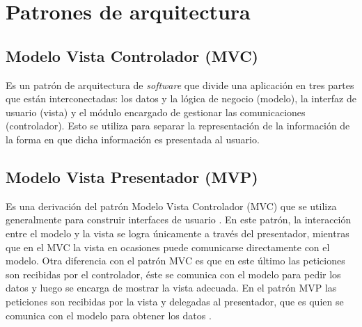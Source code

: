 \section{Patrones de arquitectura} \label{sect:Patrones de arquitectura}

\subsection{Modelo Vista Controlador (MVC)}

Es un patrón de arquitectura de \textit{software} que divide una aplicación  en tres partes que están interconectadas: los datos y la lógica de negocio (modelo), la interfaz de usuario (vista) y el módulo encargado de gestionar las comunicaciones (controlador). Esto se utiliza para separar la representación de la información de la forma en que dicha información es presentada al usuario.

\subsection{Modelo Vista Presentador (MVP)}

Es una derivación del patrón Modelo Vista Controlador (MVC) que se utiliza generalmente para construir interfaces de usuario \cite{MVP0}. En este patrón, la interacción entre el modelo y la vista se logra únicamente a través del presentador, mientras que en el MVC la vista en ocasiones puede comunicarse directamente con el modelo. Otra diferencia con el patrón MVC es que en este último las peticiones son recibidas por el controlador, éste se comunica con el modelo para pedir los datos y luego se encarga de mostrar la vista adecuada. En el patrón MVP las peticiones son recibidas por la vista y delegadas al presentador, que es quien se comunica con el modelo para obtener los datos \cite{MVP1}.